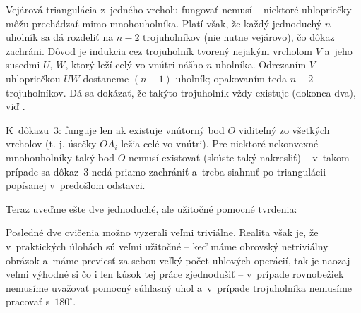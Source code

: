 {    Vejárová triangulácia z~jedného vrcholu fungovať nemusí -- niektoré uhlopriečky môžu prechádzať mimo mnohouholníka. Platí však, že každý jednoduchý $n$-uholník sa dá rozdeliť na $n-2$ trojuholníkov (nie nutne vejárovo), čo dôkaz zachráni. Dôvod je indukcia cez trojuholník tvorený nejakým vrcholom $V$ a~jeho susedmi $U$, $W$, ktorý leží celý vo vnútri nášho $n$-uholníka. Odrezaním $V$ uhlopriečkou $UW$ dostaneme $(n-1)$-uholník; opakovaním teda $n-2$ trojuholníkov. Dá sa dokázať, že takýto trojuholník vždy existuje (dokonca dva), viď .

    K~dôkazu~3: funguje len ak existuje vnútorný bod $O$ viditeľný zo všetkých vrcholov (t. j. úsečky $OA_i$ ležia celé vo vnútri). Pre niektoré nekonvexné mnohouholníky taký bod $O$ nemusí existovať (skúste taký nakresliť) -- v~takom prípade sa dôkaz~3 nedá priamo zachrániť a~treba siahnuť po triangulácii popísanej v~predošlom odstavci.
}

Teraz uveďme ešte dve jednoduché, ale užitočné pomocné tvrdenia:



Posledné dve cvičenia možno vyzerali veľmi triviálne. Realita však je, že v~praktických úlohách sú veľmi užitočné -- keď máme obrovský netriviálny obrázok a~máme previesť za sebou veľký počet uhlových operácií, tak je naozaj veľmi výhodné si čo i len kúsok tej práce zjednodušiť -- v~prípade rovnobežiek nemusíme uvažovať pomocný súhlasný uhol a~v~prípade trojuholníka nemusíme pracovať s~$180^\circ$.

